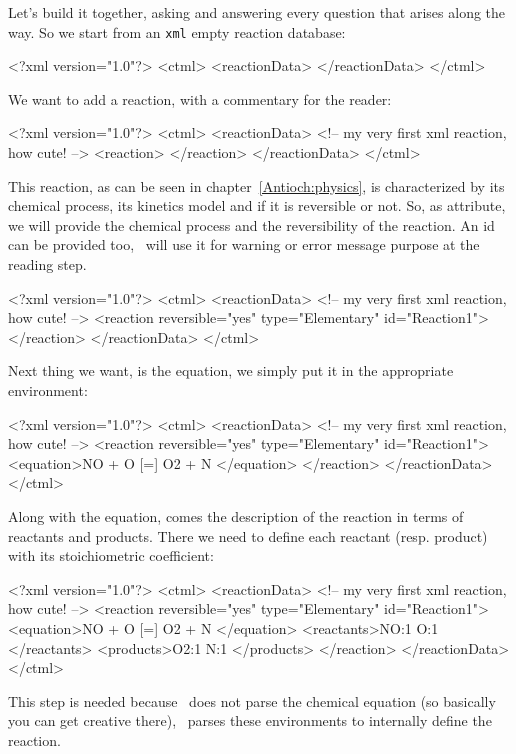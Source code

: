 Let's build it together, asking and answering every question that
arises along the way.
So we start from an \verb!xml! empty reaction database:
%
\begin{xml}
<?xml version="1.0"?>
<ctml>
  <reactionData>
  </reactionData>
</ctml>
\end{xml}
%
We want to add a reaction, with a commentary for the
reader:
\begin{xml}
<?xml version="1.0"?>
<ctml>
  <reactionData>
    <!-- my very first xml reaction, how cute! -->
    <reaction>
    </reaction>
  </reactionData>
</ctml>
\end{xml}
This reaction, as can be seen in chapter~\ref{Antioch:physics},
is characterized by its chemical process, its kinetics model and
if it is reversible or not. So, as attribute, we will provide
the chemical process and the reversibility of the reaction. An id
can be provided too, \Antioch\ will use it for warning or error
message purpose at the reading step.
\begin{xml}
<?xml version="1.0"?>
<ctml>
  <reactionData>
    <!-- my very first xml reaction, how cute! -->
    <reaction reversible="yes" type="Elementary" id="Reaction1">
    </reaction>
  </reactionData>
</ctml>
\end{xml}
Next thing we want, is the equation, we simply put it in the
appropriate environment:
\begin{xml}
<?xml version="1.0"?>
<ctml>
  <reactionData>
    <!-- my very first xml reaction, how cute! -->
    <reaction reversible="yes" type="Elementary" id="Reaction1">
      <equation>NO + O [=] O2 + N </equation>
    </reaction>
  </reactionData>
</ctml>
\end{xml}
Along with the equation, comes the description of the reaction
in terms of reactants and products. There we need to define
each reactant (resp. product) with its stoichiometric
coefficient:
\begin{xml}
<?xml version="1.0"?>
<ctml>
  <reactionData>
    <!-- my very first xml reaction, how cute! -->
    <reaction reversible="yes" type="Elementary" id="Reaction1">
      <equation>NO + O [=] O2 + N </equation>
      <reactants>NO:1 O:1 </reactants>
      <products>O2:1 N:1 </products>
    </reaction>
  </reactionData>
</ctml>
\end{xml}
This step is needed because \Antioch\ does not parse the
chemical equation (so basically you can get creative there),
\Antioch\ parses these environments to internally define the
reaction.

